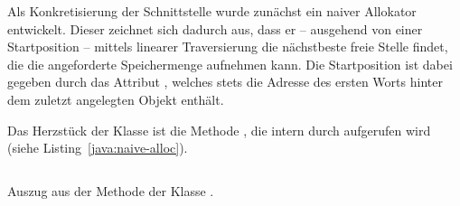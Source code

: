 Als Konkretisierung der Schnittstelle  wurde zunächst ein naiver Allokator entwickelt.
Dieser zeichnet sich dadurch aus, dass er -- ausgehend von einer Startposition -- mittels linearer Traversierung die nächstbeste freie Stelle findet, die die angeforderte Speichermenge aufnehmen kann.
Die Startposition ist dabei gegeben durch das Attribut , welches stets die Adresse des ersten Worts hinter dem zuletzt angelegten Objekt enthält.

Das Herzstück der Klasse  ist die Methode , die intern durch  aufgerufen wird (siehe Listing~\ref{java:naive-alloc}).

\begin{listing}[h]
\inputminted[]{java}{code/NaiveAlloc-allocate.java}
\caption[Methode  der Klasse ]{Auszug aus der Methode  der Klasse .}
\label{java:naive-alloc}
\end{listing}